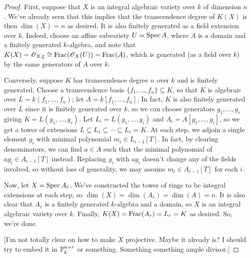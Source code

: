 \begin{proof}
	First, suppose that $X$ is an integral algebraic variety over $k$ of dimension $n$. We've already seen that this implies that the transcendence degree of $K(X)$ is then $\dim(X) = n$ as desired. It is also finitely generated as a field extension over $k$. Indeed, choose an affine subvariety $U = \operatorname{Spec} A$, where $A$ is a domain and a finitely generated $k$-algebra, and note that $K(X) = \mathscr{O}_{X,\xi} \cong \operatorname{Frac}(\mathscr{O}_X(U)) = \operatorname{Frac}(A)$, which is generated (as a field over $k$) by the same generators of $A$ over $k$.
	
	Conversely, suppose $K$ has transcendence degree $n$ over $k$ and is finitely generated. Choose a transcendence basis $\{f_1,\ldots,f_n\} \subseteq K$, so that $K$ is algebraic over $L = k(f_1,\ldots,f_n)$; let $A = k[f_1,\ldots,f_n]$. In fact, $K$ is also finitely generated over $L$ since it is finitely generated over $k$, so we can choose generators $g_1,\ldots,g_r$ giving $K = L(g_1,\ldots,g_r)$. Let $L_i = L(g_1,\ldots,g_i)$ and $A_i = A[g_1,\ldots,g_i]$, so we get a tower of extensions $L \subseteq L_1 \subseteq \cdots \subseteq L_r = K$. At each step, we adjoin a single element $g_i$ with minimal polynomial $m_i \in L_{i-1}[T]$. In fact, by clearing denominators, we can find $a \in A$ such that the minimal polynomial of $ag_i \in A_{i-1}[T]$ instead. Replacing $g_i$ with $ag_i$ doesn't change any of the fields involved, so without loss of generality, we may assume $m_i \in A_{i-1}[T]$ for each $i$.
	
	Now, let $X = \operatorname{Spec} A_r$. We've constructed the tower of rings to be integral extensions at each step, so $\dim(X) = \dim(A_r) = \dim(A) = n$. It is also clear that $A_r$ is a finitely generated $k$-algebra and a domain, so $X$ is an integral algebraic variety over $k$. Finally, $K(X) = \operatorname{Frac}(A_r) = L_r = K$ as desired. So, we're done.
	
	[I'm not totally clear on how to make $X$ projective. Maybe it already is? I should try to embed it in $\mathbb{P}_k^{n+r}$ or something. Something something ample divisor.]
\end{proof}
